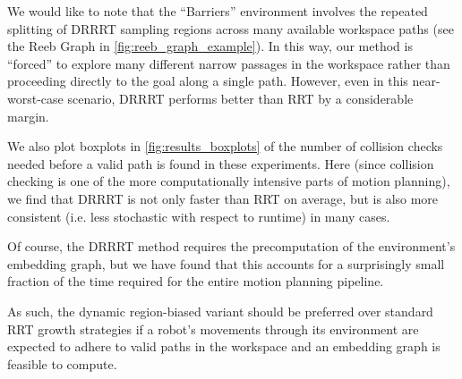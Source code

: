 \documentclass[conference]{IEEEtran}
\begin{document}
We would like to note that the ``Barriers'' environment involves the repeated splitting of DRRRT sampling regions across many available workspace paths (see the Reeb Graph in \autoref{fig:reeb_graph_example}). In this way, our method is ``forced'' to explore many different narrow passages in the workspace rather than proceeding directly to the goal along a single path. However, even in this near-worst-case scenario, DRRRT performs better than RRT by a considerable margin.

We also plot boxplots in \autoref{fig:results_boxplots} of the number of collision checks needed before a valid path is found in these experiments. Here (since collision checking is one of the more computationally intensive parts of motion planning), we find that DRRRT is not only faster than RRT on average, but is also more consistent (i.e. less stochastic with respect to runtime) in many cases.

Of course, the DRRRT method requires the precomputation of the environment's embedding graph, but we have found that this accounts for a surprisingly small fraction of the time required for the entire motion planning pipeline.

As such, the dynamic region-biased variant should be preferred over standard RRT growth strategies if a robot's movements through its environment are expected to adhere to valid paths in the workspace and an embedding graph is feasible to compute.
\end{document}
